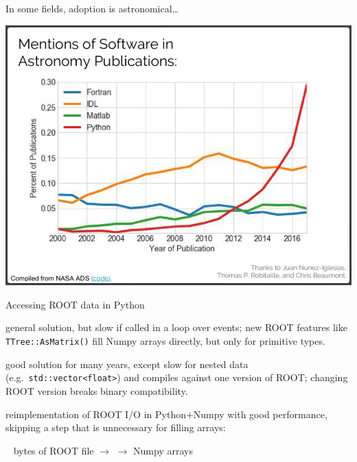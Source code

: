 \documentclass[aspectratio=169]{beamer}
\begin{document}
\begin{frame}{In some fields, adoption is astronomical\ldots}
\vspace{0.25 cm}
\begin{center}
\includegraphics[width=0.7\linewidth]{mentions-of-programming-languages.png}
\end{center}
\end{frame}

\begin{frame}{Accessing ROOT data in Python}
\large
\vspace{0.5 cm}
\renewcommand\CancelColor{\color{red}}
\begin{description}\setlength{\itemsep}{0.5 cm}
\item[PyROOT:] general solution, but slow if called in a loop over events; new ROOT features like {\normalsize\tt TTree::AsMatrix()} fill Numpy arrays directly, but only for primitive types.

\item[root\_numpy:]<2-> good solution for many years, except slow for nested data (e.g.~{\normalsize\tt std::vector<float>}) and compiles against one version of ROOT; changing ROOT version breaks binary compatibility.

\item[uproot:]<3-> reimplementation of ROOT I/O in Python+Numpy with good performance, skipping a step that is unnecessary for filling arrays:

\vspace{0.35 cm}
\mbox{ } \hfill bytes of ROOT file $\to$  $\to$ Numpy arrays \hfill \mbox{ }

\vspace{0.35 cm}
\end{description}
\end{frame}
\end{document}
